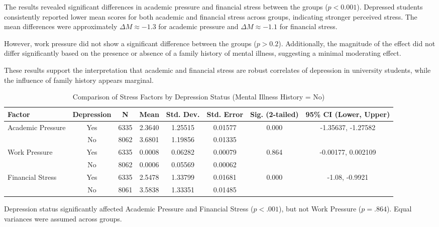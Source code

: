 \documentclass[conference]{IEEEtran}
\begin{document}
The results revealed significant differences in academic pressure and financial stress between the groups ($p < 0.001$). Depressed students consistently reported lower mean scores for both academic and financial stress across groups, indicating stronger perceived stress. The mean differences were approximately $\Delta M \approx -1.3$ for academic pressure and $\Delta M \approx -1.1$ for financial stress.

However, work pressure did not show a significant difference between the groups ($p > 0.2$). Additionally, the magnitude of the effect did not differ significantly based on the presence or absence of a family history of mental illness, suggesting a minimal moderating effect.

These results support the interpretation that academic and financial stress are robust correlates of depression in university students, while the influence of family history appears marginal.



\begin{table*}[htbp]
\caption{Comparison of Stress Factors by Depression Status (Mental Illness History = No)}
\begin{center}
\begin{tabular}{|l|c|c|c|c|c|c|c|}
\hline
\textbf{Factor} & \textbf{Depression} & \textbf{N} & \textbf{Mean} & \textbf{Std. Dev.} & \textbf{Std. Error} & \textbf{Sig. (2-tailed)} & \textbf{95\% CI (Lower, Upper)} \\
\hline
\multirow{2}{*}{Academic Pressure} & Yes & 6335 & 2.3640 & 1.25515 & 0.01577 & \multirow{2}{*}{0.000} & -1.35637, -1.27582 \\
                                   & No  & 8062 & 3.6801 & 1.19856 & 0.01335 &                          &                      \\
\hline
\multirow{2}{*}{Work Pressure}     & Yes & 6335 & 0.0008 & 0.06282 & 0.00079 & \multirow{2}{*}{0.864} & -0.00177, 0.002109 \\
                                   & No  & 8062 & 0.0006 & 0.05569 & 0.00062 &                         &                     \\
\hline
\multirow{2}{*}{Financial Stress}  & Yes & 6335 & 2.5478 & 1.33799 & 0.01681 & \multirow{2}{*}{0.000} & -1.08, -0.9921 \\
                                   & No  & 8061 & 3.5838 & 1.33351 & 0.01485 &                        &                  \\
\hline
\end{tabular}
\label{tab:depression_factors}
\end{center}
\vspace{-1em}
\begin{flushleft}
\footnotesize Depression status significantly affected Academic Pressure and Financial Stress ($p < .001$), but not Work Pressure ($p = .864$). Equal variances were assumed across groups.
\end{flushleft}
\end{table*}
\end{document}
